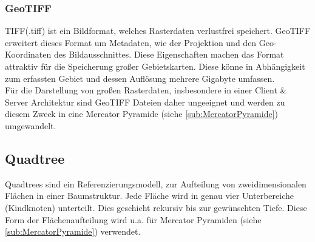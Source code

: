 \documentclass[10pt,conference,compsocconf]{IEEEtran}
\begin{document}
\subsubsection{GeoTIFF}
TIFF(.tiff) ist ein Bildformat, welches Rasterdaten verlustfrei speichert. GeoTIFF erweitert dieses Format um Metadaten, wie der Projektion und den Geo-Koordinaten des Bildausschnittes. Diese Eigenschaften machen das Format attraktiv für die Speicherung großer Gebietskarten. Diese könne in Abhängigkeit zum erfassten Gebiet und dessen Auflösung mehrere Gigabyte umfassen. \\
Für die Darstellung von großen Rasterdaten, insbesondere in einer Client \& Server Architektur sind GeoTIFF Dateien daher ungeeignet und werden zu diesem Zweck in eine Mercator Pyramide (siehe \ref{sub:MercatorPyramide}) umgewandelt.


\subsection{Quadtree}
Quadtrees\cite{QuadTrees} sind ein Referenzierungsmodell, zur Aufteilung von zweidimensionalen Flächen in einer Baumstruktur. Jede Fläche wird in genau vier Unterbereiche (Kindknoten) unterteilt. Dies geschieht rekursiv bis zur gewünschten Tiefe. Diese Form der Flächenaufteilung wird u.a. für Mercator Pyramiden (siehe \ref{sub:MercatorPyramide}) verwendet.
\end{document}

